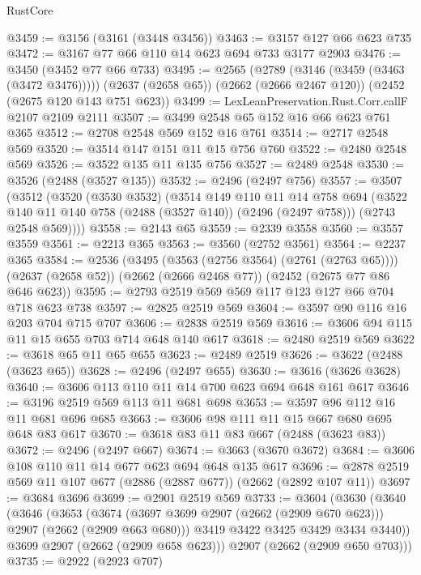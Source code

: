 \begin{lexlean}{RustCore}
\begin{coremodule}
@3459 := @3156 (@3161 (@3448 @3456))
@3463 := @3157 @127 @66 @623 @735
@3472 := @3167 @77 @66 @110 @14 @623 @694 @733 @3177 @2903
@3476 := @3450 (@3452 @77 @66 @733)
@3495 := @2565
    (@2789 (@3146 (@3459 (@3463 (@3472 @3476)))))
    (@2637 (@2658 @65))
    (@2662 (@2666 @2467 @120))
    (@2452 (@2675 @120 @143 @751 @623))
@3499 := LexLeanPreservation.Rust.Corr.callF @2107 @2109 @2111
@3507 := @3499 @2548 @65 @152 @16 @66 @623 @761 @365
@3512 := @2708 @2548 @569 @152 @16 @761
@3514 := @2717 @2548 @569
@3520 := @3514 @147 @151 @11 @15 @756 @760
@3522 := @2480 @2548 @569
@3526 := @3522 @135 @11 @135 @756
@3527 := @2489 @2548
@3530 := @3526 (@2488 (@3527 @135))
@3532 := @2496 (@2497 @756)
@3557 := @3507
    (@3512
      (@3520
        (@3530 @3532)
        (@3514
          @149
          @110
          @11
          @14
          @758
          @694
          (@3522 @140 @11 @140 @758 (@2488 (@3527 @140)) (@2496 (@2497 @758)))
          (@2743 @2548 @569))))
@3558 := @2143 @65
@3559 := @2339 @3558
@3560 := @3557 @3559
@3561 := @2213 @365
@3563 := @3560 (@2752 @3561)
@3564 := @2237 @365
@3584 := @2536
    (@3495 (@3563 (@2756 @3564) (@2761 (@2763 @65))))
    (@2637 (@2658 @52))
    (@2662 (@2666 @2468 @77))
    (@2452 (@2675 @77 @86 @646 @623))
@3595 := @2793 @2519 @569 @569 @117 @123 @127 @66 @704 @718 @623 @738
@3597 := @2825 @2519 @569
@3604 := @3597 @90 @116 @16 @203 @704 @715 @707
@3606 := @2838 @2519 @569
@3616 := @3606 @94 @115 @11 @15 @655 @703 @714 @648 @140 @617
@3618 := @2480 @2519 @569
@3622 := @3618 @65 @11 @65 @655
@3623 := @2489 @2519
@3626 := @3622 (@2488 (@3623 @65))
@3628 := @2496 (@2497 @655)
@3630 := @3616 (@3626 @3628)
@3640 := @3606 @113 @110 @11 @14 @700 @623 @694 @648 @161 @617
@3646 := @3196 @2519 @569 @113 @11 @681 @698
@3653 := @3597 @96 @112 @16 @11 @681 @696 @685
@3663 := @3606 @98 @111 @11 @15 @667 @680 @695 @648 @83 @617
@3670 := @3618 @83 @11 @83 @667 (@2488 (@3623 @83))
@3672 := @2496 (@2497 @667)
@3674 := @3663 (@3670 @3672)
@3684 := @3606 @108 @110 @11 @14 @677 @623 @694 @648 @135 @617
@3696 := @2878 @2519 @569 @11 @107 @677 (@2886 (@2887 @677)) (@2662 (@2892 @107 @11))
@3697 := @3684 @3696
@3699 := @2901 @2519 @569
@3733 := @3604
    (@3630
      (@3640
        (@3646
          (@3653
            (@3674 (@3697 @3699 @2907 (@2662 (@2909 @670 @623))) @2907 (@2662 (@2909 @663 @680)))
            @3419
            @3422
            @3425
            @3429
            @3434
            @3440))
        @3699
        @2907
        (@2662 (@2909 @658 @623)))
      @2907
      (@2662 (@2909 @650 @703)))
@3735 := @2922 (@2923 @707)

\end{coremodule}
\end{lexlean}
